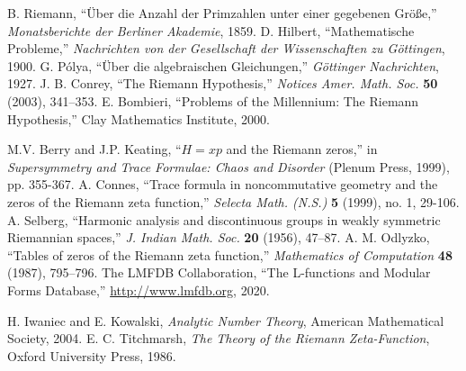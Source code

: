 \documentclass[12pt]{article}
\begin{document}
\begin{thebibliography}{99}

 B. Riemann, ``Über die Anzahl der Primzahlen unter einer gegebenen Größe,'' \textit{Monatsberichte der Berliner Akademie}, 1859.
 D. Hilbert, ``Mathematische Probleme,'' \textit{Nachrichten von der Gesellschaft der Wissenschaften zu Göttingen}, 1900.
 G. Pólya, ``Über die algebraischen Gleichungen,'' \textit{Göttinger Nachrichten}, 1927.
 J. B. Conrey, ``The Riemann Hypothesis,'' \textit{Notices Amer. Math. Soc.} \textbf{50} (2003), 341--353.
 E. Bombieri, ``Problems of the Millennium: The Riemann Hypothesis,'' Clay Mathematics Institute, 2000.

 M.V. Berry and J.P. Keating, ``$H=xp$ and the Riemann zeros,'' in \textit{Supersymmetry and Trace Formulae: Chaos and Disorder} (Plenum Press, 1999), pp. 355-367.
 A. Connes, ``Trace formula in noncommutative geometry and the zeros of the Riemann zeta function,'' \textit{Selecta Math. (N.S.)} \textbf{5} (1999), no. 1, 29-106.
 A. Selberg, ``Harmonic analysis and discontinuous groups in weakly symmetric Riemannian spaces,'' \textit{J. Indian Math. Soc.} \textbf{20} (1956), 47--87.
 A. M. Odlyzko, ``Tables of zeros of the Riemann zeta function,'' \textit{Mathematics of Computation} \textbf{48} (1987), 795--796.
 The LMFDB Collaboration, ``The L-functions and Modular Forms Database,'' \url{http://www.lmfdb.org}, 2020.

 H. Iwaniec and E. Kowalski, \textit{Analytic Number Theory}, American Mathematical Society, 2004.
 E. C. Titchmarsh, \textit{The Theory of the Riemann Zeta-Function}, Oxford University Press, 1986.

\end{thebibliography}
\end{document}
